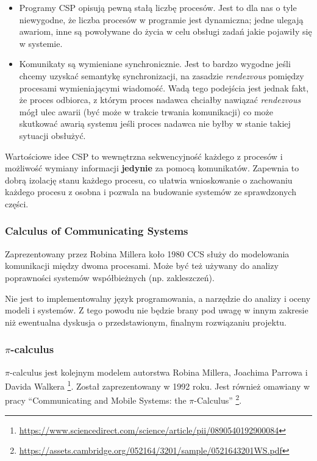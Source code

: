 \documentclass[11pt,oneside,a4paper,titlepage,onecolumn]{article}
\begin{document}
\begin{itemize}
\item Programy CSP opisują pewną stałą liczbę procesów. Jest to dla nas o tyle niewygodne, że liczba
    procesów w programie jest dynamiczna; jedne ulegają awariom, inne są powoływane do życia w celu
    obsługi zadań jakie pojawiły się w systemie.
\item Komunikaty są wymieniane synchronicznie. Jest to bardzo wygodne jeśli chcemy uzyskać semantykę
    synchronizacji, na zasadzie \emph{rendezvous} pomiędzy procesami wymieniającymi wiadomość.
    Wadą tego podejścia jest jednak fakt, że proces odbiorca, z którym proces nadawca chciałby nawiązać
    \emph{rendezvous} mógł ulec awarii (być może w trakcie trwania komunikacji) co może skutkować
    awarią systemu jeśli proces nadawca nie byłby w stanie takiej sytuacji obsłużyć.
\end{itemize}

Wartościowe idee CSP to wewnętrzna sekwencyjność każdego z procesów i możliwość wymiany informacji
\textbf{jedynie} za pomocą komunikatów. Zapewnia to dobrą izolację stanu każdego procesu, co ułatwia
wnioskowanie o zachowaniu każdego procesu z osobna i pozwala na budowanie systemów ze sprawdzonych
części.

\subsubsection{Calculus of Communicating Systems}

Zaprezentowany przez Robina Millera koło 1980 CCS służy do modelowania komunikacji między dwoma
procesami. Może być też używany do analizy poprawności systemów współbieżnych (np. zakleszczeń).

Nie jest to implementowalny język programowania, a narzędzie do analizy i oceny modeli i systemów.
Z tego powodu nie będzie brany pod uwagę w innym zakresie niż ewentualna dyskusja o przedstawionym, finalnym
rozwiązaniu projektu.

\subsubsection{$\pi$-calculus}

$\pi$-calculus jest kolejnym modelem autorstwa Robina Millera, Joachima Parrowa i Davida Walkera
\footnote{\url{https://www.sciencedirect.com/science/article/pii/0890540192900084}}.
Został zaprezentowany w 1992 roku.
Jest również omawiany w pracy ``Communicating and Mobile Systems: the $\pi$-Calculus''
\footnote{\url{https://assets.cambridge.org/052164/3201/sample/0521643201WS.pdf}}.
\end{document}
